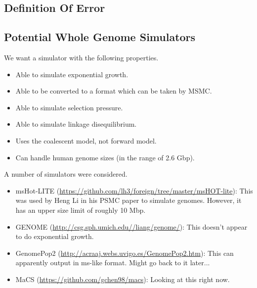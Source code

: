 \documentclass[11pt,a4paper]{article}
\begin{document}
\subsection{Definition Of Error}

\subsection{Potential Whole Genome Simulators}
We want a simulator with the following properties.
\begin{itemize}
\item Able to simulate exponential growth.
\item Able to be converted to a format which can be taken by MSMC.
\item Able to simulate selection pressure.
\item Able to simulate linkage disequilibrium.
\item Uses the coalescent model, not forward model.
\item Can handle human genome sizes (in the range of 2.6 Gbp).
\end{itemize}
A number of simulators were considered.
\begin{itemize}
\item msHot-LITE (\url{https://github.com/lh3/foreign/tree/master/msHOT-lite}): This was used by Heng Li in his PSMC paper to simulate genomes. However, it has an upper size limit of roughly 10 Mbp.
\item GENOME (\url{http://csg.sph.umich.edu//liang/genome/}): This doesn't appear to do exponential growth.
\item GenomePop2 (\url{http://acraaj.webs.uvigo.es/GenomePop2.htm}): This can apparently output in ms-like format. Might go back to it later...
\item MaCS (\url{https://github.com/gchen98/macs}): Looking at this right now.
\end{itemize}




{}
\end{document}
